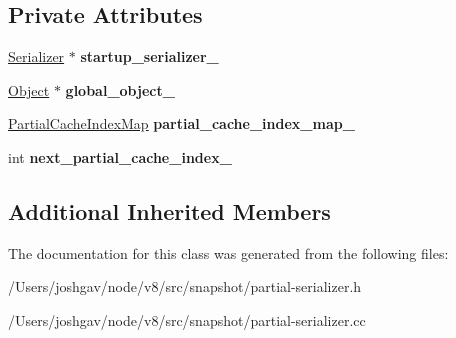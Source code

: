 \subsection*{Private Attributes}
\begin{DoxyCompactItemize}
\item 
\hyperlink{classv8_1_1internal_1_1_serializer}{Serializer} $\ast$ {\bfseries startup\+\_\+serializer\+\_\+}\hypertarget{classv8_1_1internal_1_1_partial_serializer_a739a392d23c8cf57d2537f9ae90df772}{}\label{classv8_1_1internal_1_1_partial_serializer_a739a392d23c8cf57d2537f9ae90df772}

\item 
\hyperlink{classv8_1_1internal_1_1_object}{Object} $\ast$ {\bfseries global\+\_\+object\+\_\+}\hypertarget{classv8_1_1internal_1_1_partial_serializer_acead87e0ab6f4f7a1cae6778178783f7}{}\label{classv8_1_1internal_1_1_partial_serializer_acead87e0ab6f4f7a1cae6778178783f7}

\item 
\hyperlink{classv8_1_1internal_1_1_partial_serializer_1_1_partial_cache_index_map}{Partial\+Cache\+Index\+Map} {\bfseries partial\+\_\+cache\+\_\+index\+\_\+map\+\_\+}\hypertarget{classv8_1_1internal_1_1_partial_serializer_ae4205fa0c0cf2e65d04bbbfcbe25789b}{}\label{classv8_1_1internal_1_1_partial_serializer_ae4205fa0c0cf2e65d04bbbfcbe25789b}

\item 
int {\bfseries next\+\_\+partial\+\_\+cache\+\_\+index\+\_\+}\hypertarget{classv8_1_1internal_1_1_partial_serializer_a4af24dfd04acc33f8c02a8bdf6605bf0}{}\label{classv8_1_1internal_1_1_partial_serializer_a4af24dfd04acc33f8c02a8bdf6605bf0}

\end{DoxyCompactItemize}
\subsection*{Additional Inherited Members}


The documentation for this class was generated from the following files\+:\begin{DoxyCompactItemize}
\item 
/\+Users/joshgav/node/v8/src/snapshot/partial-\/serializer.\+h\item 
/\+Users/joshgav/node/v8/src/snapshot/partial-\/serializer.\+cc\end{DoxyCompactItemize}
